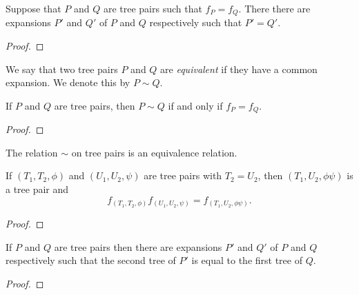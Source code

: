 \begin{lemma}\label{lem:map_eqiv_to_expansion_equiv}
    Suppose that \(P\) and \(Q\) are tree pairs such that \(f_P=f_Q\).
    There there are expansions \(P'\) and \(Q'\) of \(P\) and \(Q\) respectively such that \(P'=Q'\).
\end{lemma}
\begin{proof}
\end{proof}

\begin{definition}\label{lem:tree_pair_equivalence}
    We say that two tree pairs \(P\) and \(Q\) are \emph{equivalent} if they have a common expansion.
    We denote this by \(P\sim Q\).
\end{definition}
\begin{theorem}\label{thm:Vtree_Vcant_bijection}
    If \(P\) and \(Q\) are tree pairs, then \(P\sim Q\) if and only if \(f_P=f_Q\).
\end{theorem}
\begin{proof}
\end{proof}
\begin{corollary}\label{cor:tree_equiv_is_equiv}
The relation \(\sim\) on tree pairs is an equivalence relation.
\end{corollary}

\begin{lemma}\label{lem:cat_comp}
If \((T_1,T_2,\phi)\) and \((U_1,U_2,\psi)\) are tree pairs with \(T_2=U_2\), then \((T_1,U_2,\phi \psi)\) is a tree pair and
\[f_{(T_1,T_2,\phi)}f_{(U_1,U_2,\psi)}=f_{(T_1,U_2,\phi \psi)}.\]
\end{lemma}
\begin{proof}
\end{proof}
\begin{lemma}\label{lem:compable_expansion}
If \(P\) and \(Q\) are tree pairs then there are expansions \(P'\) and \(Q'\) of \(P\) and \(Q\) respectively such that the second tree of \(P'\) is equal to the first tree of \(Q\).
\end{lemma}
\begin{proof}
\end{proof}

